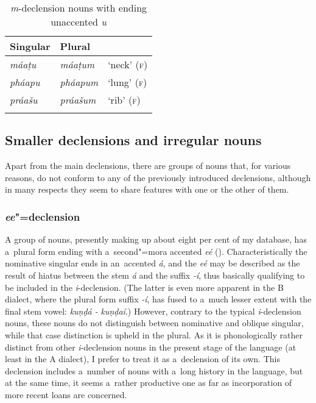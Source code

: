 \begin{table}[ht]
\caption{\textit{m}-declension nouns with ending unaccented \textit{u}}
\begin{tabularx}{\textwidth}{ Q Q Q }
\lsptoprule
Singular &
Plural &
\\\midrule
\textit{máaṭu} &
\textit{máaṭum} &
`neck' (\textsc{f})\\
\textit{pháapu} &
\textit{pháapum} &
`lung' (\textsc{f})\\
\textit{práašu} &
\textit{práašum} &
`rib' (\textsc{f})\\\lspbottomrule
\end{tabularx}
\label{tab:4-17}
\end{table}


\subsection{Smaller declensions and irregular nouns}
\label{subsec:4-6-4}

Apart from the main declensions, there are groups of nouns that, for various reasons, do not conform to any of the previously introduced declensions, although in many respects they seem to share features with one or the other of them.

\subsubsection*{\textit{ee}"=declension}

A group of nouns, presently making up about eight per cent of my database, has a~plural form ending with a~second"=mora accented \textit{eé} (). Characteristically the nominative singular ends in an~accented \textit{á}, and the \textit{eé} may be described as the result of hiatus between the stem \textit{á} and the suffix \textit{-í}, thus basically qualifying to be included in the \textit{i}-declension. (The latter is even more apparent in the B dialect, where the plural form suffix \textit{-í}, has fused to a~much lesser extent with the final stem vowel: \textit{kuṇḍá -} \textit{kuṇḍaí}.) However, contrary to the typical \textit{i}-declension nouns, these nouns do not distinguish between nominative and oblique singular, while that case distinction is upheld in the plural. As it is phonologically rather distinct from other \textit{i}-declension nouns in the present stage of the language (at least in the A dialect), I prefer to treat it as a~declension of its own. This declension includes a~number of nouns with a~long history in the language, but at the same time, it seems a~rather productive one as far as incorporation of more recent loans are concerned.


